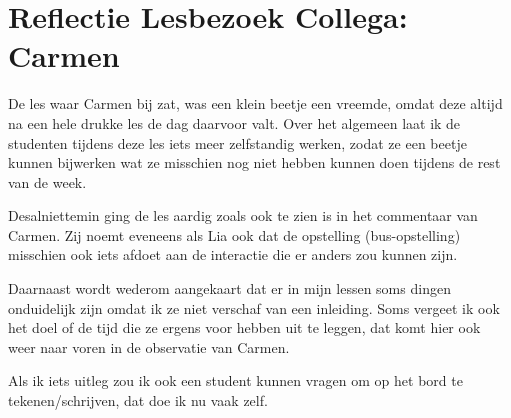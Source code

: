 
\section{Reflectie Lesbezoek Collega: Carmen}
\label{sec:lesbezoekcollega}
De les waar Carmen bij zat, was een klein beetje een vreemde, omdat deze altijd na een hele drukke les de dag daarvoor valt. Over het algemeen laat ik de studenten tijdens deze les iets meer zelfstandig werken, zodat ze een beetje kunnen bijwerken wat ze misschien nog niet hebben kunnen doen tijdens de rest van de week.

Desalniettemin ging de les aardig zoals ook te zien is in het commentaar van Carmen. Zij noemt eveneens als Lia ook dat de opstelling (bus-opstelling) misschien ook iets afdoet aan de interactie die er anders zou kunnen zijn.

Daarnaast wordt wederom aangekaart dat er in mijn lessen soms dingen onduidelijk zijn omdat ik ze niet verschaf van een inleiding. Soms vergeet ik ook het doel of de tijd die ze ergens voor hebben uit te leggen, dat komt hier ook weer naar voren in de observatie van Carmen.

Als ik iets uitleg zou ik ook een student kunnen vragen om op het bord te tekenen/schrijven, dat doe ik nu vaak zelf.

